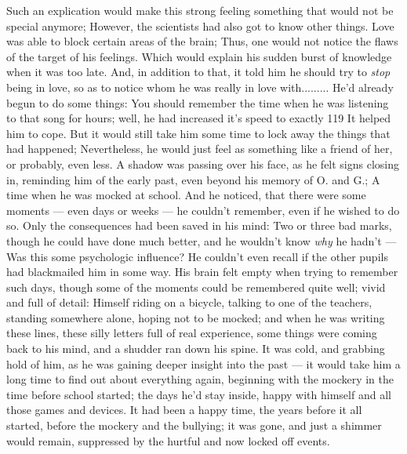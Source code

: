 Such an explication would make this strong feeling something that would not be special anymore; However, the scientists had also got to know other things. Love was able to block certain areas of the brain; Thus, one would not notice the flaws of the target of his feelings. 
Which would explain his sudden burst of knowledge when it was too late. And, in addition to that, it told him he should try to \emph{stop} being in love, so as to notice whom he was really in love with.........
He'd already begun to do some things: You should remember the time when he was listening to that song for hours; well, he had increased it's speed to exactly 119 %
It helped him to cope. 
But it would still take him some time to lock away the things that had happened; Nevertheless, he would just feel as something like a friend of her, or probably, even less. 
A shadow was passing over his face, as he felt signs closing in, reminding him of the early past, even beyond his memory of O. and G.; A time when he was mocked at school. 
And he noticed, that there were some moments --- even days or weeks --- he couldn't remember, even if he wished to do so. Only the consequences had been saved in his mind: Two or three bad marks, though he could have done much better, and he wouldn't know \emph{why} he hadn't --- Was this some psychologic influence? He couldn't even recall if the other pupils had blackmailed him in some way. 
His brain felt empty when trying to remember such days, though some of the moments could be remembered quite well; vivid and full of detail: Himself riding on a bicycle, talking to one of the teachers, standing somewhere alone, hoping not to be mocked; and when he was writing these lines, these silly letters full of real experience, some things were coming back to his mind, and a shudder ran down his spine. 
It was cold, and grabbing hold of him, as he was gaining deeper insight into the past --- it would take him a long time to find out about everything again, beginning with the mockery in the time before school started; the days he'd stay inside, happy with himself and all those games and devices. 
It had been a happy time, the years before it all started, before the mockery and the bullying; it was gone, and just a shimmer would remain, suppressed by the hurtful and now locked off events. 
